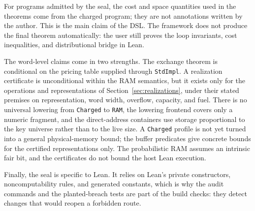 \documentclass[acmsmall,nonacm]{acmart}
\begin{document}
For programs admitted by the seal, the cost and space quantities used in the theorems come from the charged program; they are not annotations written by the author.
This is the main claim of the DSL.
The framework does not produce the final theorem automatically: the user still proves the loop invariants, cost inequalities, and distributional bridge in Lean.

The word-level claims come in two strengths.
The exchange theorem is conditional on the pricing table supplied through \lstinline{StdImpl}.
A realization certificate is unconditional within the RAM semantics, but it exists only for the operations and representations of Section~\ref{sec:realizations}, under their stated premises on representation, word width, overflow, capacity, and fuel.
There is no universal lowering from \lstinline{Charged} to \lstinline{RAM}, the lowering frontend covers only a numeric fragment, and the direct-address containers use storage proportional to the key universe rather than to the live size.
A \lstinline{Charged} profile is not yet turned into a general physical-memory bound; the buffer predicates give concrete bounds for the certified representations only.
The probabilistic RAM assumes an intrinsic fair bit, and the certificates do not bound the host Lean execution.

Finally, the seal is specific to Lean.
It relies on Lean's private constructors, noncomputability rules, and generated constants, which is why the audit commands and the planted-breach tests are part of the build checks: they detect changes that would reopen a forbidden route.
\end{document}
